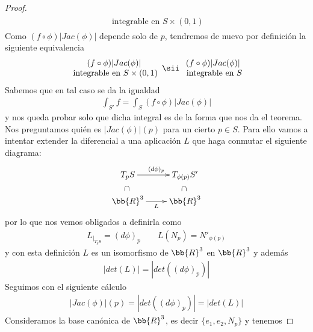 \begin{teo}
\begin{proof}
\begin{gather*}
\begin{array}{c}
                \text{ integrable en $S\times(0,1)$}
            \end{array}
        \end{gather*}
        Como $(f\circ \phi)|Jac(\phi)|$ depende solo de $p$, tendremos de nuevo por definición la siguiente equivalencia
        \begin{gather*}
            \begin{array}{c}
                (f\circ \phi)|Jac(\phi)| \\
                \text{ integrable en $S\times(0,1)$}
            \end{array}
            \sii 
            \begin{array}{c}
                (f\circ \phi)|Jac(\phi)| \\
                \text{ integrable en $S$}
            \end{array}
        \end{gather*}
        Sabemos que en tal caso se da la igualdad
        \begin{gather*}
            \int_{S'}f = \int_S (f\circ \phi) |Jac(\phi)|
        \end{gather*}
        y nos queda probar solo que dicha integral es de la forma que nos da el teorema. Nos preguntamos quién es $|Jac(\phi)|(p)$ para un cierto $p\in S$. Para ello vamos a intentar extender la diferencial a una aplicación $L$ que haga conmutar el siguiente diagrama:
        \begin{gather*}
            \xymatrix@R=5mm{
                T_pS \ar[r]^{(d\phi)_p} \ar@{}[d]|-*[@]{\subset} & T_{\phi(p)}S' \ar@{}[d]|-*[@]{\subset}\\
                \bb{R}^3 \ar[r]_L & \bb{R}^3
            }
        \end{gather*}
        por lo que nos vemos obligados a definirla como 
        \begin{gather*}
            L_{|_{T_pS}} = (d\phi)_p \qquad L(N_p) = N'_{\phi(p)}
        \end{gather*}
        y con esta definición $L$ es un isomorfismo de $\bb{R}^3$ en $\bb{R}^3$ y además
        \begin{gather*}
            |det(L)| = |det((d\phi)_p)|
        \end{gather*}
        Seguimos con el siguiente cálculo
        \begin{gather*}
            |Jac(\phi)|(p) = |det((d\phi)_p)| = |det(L)|
        \end{gather*}
        Consideramos la base canónica de $\bb{R}^3$, es decir $\{e_1, e_2, N_p\}$ y tenemos 

\end{proof}
\end{teo}
